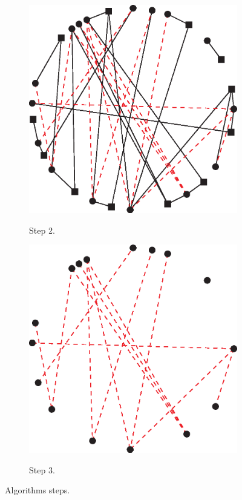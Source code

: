 \begin{figure}[h]
\begin{subfigure}[b]{0.3\textwidth}
          \includegraphics[width=\textwidth]{chapters/03_implementation/cs_motif_2}
          \label{fig:motifs_alg_2}
          \caption{Step 2.}
        \end{subfigure}
        \quad
        \begin{subfigure}[b]{0.3\textwidth}
          \includegraphics[width=\textwidth]{chapters/03_implementation/cs_motif_3}
          \label{fig:motifs_alg_3}
          \caption{Step 3.}
        \end{subfigure}
        \caption{Algorithms steps.}
        \label{fig:motifs_alg}
      \end{figure}
